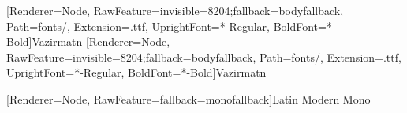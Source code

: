 [Renderer=Node, RawFeature={invisible=8204;fallback=bodyfallback}, Path=fonts/, Extension=.ttf, UprightFont=*-Regular, BoldFont=*-Bold]{Vazirmatn}
[Renderer=Node, RawFeature={invisible=8204;fallback=bodyfallback}, Path=fonts/, Extension=.ttf, UprightFont=*-Regular, BoldFont=*-Bold]{Vazirmatn}

\makeatletter
\def\zerowidthnonjoiner{%
  \texorpdfstring{%
    \TextOrMath{\nobreak\discretionary{-}{}{\char"200C\kern.03em}%
      \ifvmode\else\nobreak\hskip\z@skip\fi}{}%
  }{}%
}
\makeatother

[Renderer=Node, RawFeature={fallback=monofallback}]{Latin Modern Mono}

